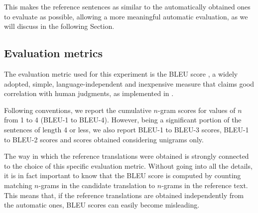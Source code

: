 This makes the reference sentences as similar to the automatically obtained ones to evaluate as possible, allowing a more meaningful automatic evaluation, as we will discuss in the following Section.

\subsection{Evaluation metrics} \label{bleu}
The evaluation metric used for this experiment is the BLEU score \cite{bleu}, a widely adopted, simple, language-independent and inexpensive measure that claims good correlation with human judgments, as implemented in \cite{thesisbleu}. \smallskip

Following conventions, we report the cumulative $n$-gram scores for values of $n$ from 1 to 4 (BLEU-1 to BLEU-4). However, being a significant portion of the sentences of length 4 or less, we also report BLEU-1 to BLEU-3 scores, BLEU-1 to BLEU-2 scores and scores obtained considering unigrams only. \smallskip

The way in which the reference translations were obtained is strongly connected to the choice of this specific evaluation metric.
Without going into all the details, it is in fact important to know that the BLEU score is computed by counting matching $n$-grams in the candidate translation to $n$-grams in the reference text. 
This means that, if the reference translations are obtained independently from the automatic ones, BLEU scores can easily become misleading. \smallskip

